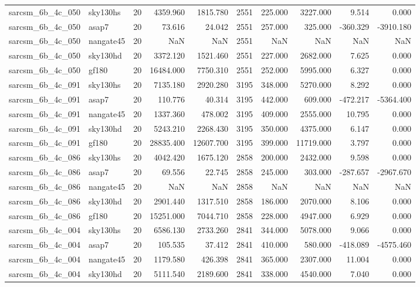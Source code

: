 \begin{longtable}{llrrrrrrrr}
sarcsm\_6b\_4c\_050 & sky130hs & 20 & 4359.960 & 1815.780 & 2551 & 225.000 & 3227.000 & 9.514 & 0.000 \\
sarcsm\_6b\_4c\_050 & asap7 & 20 & 73.616 & 24.042 & 2551 & 257.000 & 325.000 & -360.329 & -3910.180 \\
sarcsm\_6b\_4c\_050 & nangate45 & 20 & NaN & NaN & 2551 & NaN & NaN & NaN & NaN \\
sarcsm\_6b\_4c\_050 & sky130hd & 20 & 3372.120 & 1521.460 & 2551 & 227.000 & 2682.000 & 7.625 & 0.000 \\
sarcsm\_6b\_4c\_050 & gf180 & 20 & 16484.000 & 7750.310 & 2551 & 252.000 & 5995.000 & 6.327 & 0.000 \\
sarcsm\_6b\_4c\_091 & sky130hs & 20 & 7135.180 & 2920.280 & 3195 & 348.000 & 5270.000 & 8.292 & 0.000 \\
sarcsm\_6b\_4c\_091 & asap7 & 20 & 110.776 & 40.314 & 3195 & 442.000 & 609.000 & -472.217 & -5364.400 \\
sarcsm\_6b\_4c\_091 & nangate45 & 20 & 1337.360 & 478.002 & 3195 & 409.000 & 2555.000 & 10.795 & 0.000 \\
sarcsm\_6b\_4c\_091 & sky130hd & 20 & 5243.210 & 2268.430 & 3195 & 350.000 & 4375.000 & 6.147 & 0.000 \\
sarcsm\_6b\_4c\_091 & gf180 & 20 & 28835.400 & 12607.700 & 3195 & 399.000 & 11719.000 & 3.797 & 0.000 \\
sarcsm\_6b\_4c\_086 & sky130hs & 20 & 4042.420 & 1675.120 & 2858 & 200.000 & 2432.000 & 9.598 & 0.000 \\
sarcsm\_6b\_4c\_086 & asap7 & 20 & 69.556 & 22.745 & 2858 & 245.000 & 303.000 & -287.657 & -2967.670 \\
sarcsm\_6b\_4c\_086 & nangate45 & 20 & NaN & NaN & 2858 & NaN & NaN & NaN & NaN \\
sarcsm\_6b\_4c\_086 & sky130hd & 20 & 2901.440 & 1317.510 & 2858 & 186.000 & 2070.000 & 8.106 & 0.000 \\
sarcsm\_6b\_4c\_086 & gf180 & 20 & 15251.000 & 7044.710 & 2858 & 228.000 & 4947.000 & 6.929 & 0.000 \\
sarcsm\_6b\_4c\_004 & sky130hs & 20 & 6586.130 & 2733.260 & 2841 & 344.000 & 5078.000 & 9.066 & 0.000 \\
sarcsm\_6b\_4c\_004 & asap7 & 20 & 105.535 & 37.412 & 2841 & 410.000 & 580.000 & -418.089 & -4575.460 \\
sarcsm\_6b\_4c\_004 & nangate45 & 20 & 1179.580 & 426.398 & 2841 & 365.000 & 2307.000 & 11.004 & 0.000 \\
sarcsm\_6b\_4c\_004 & sky130hd & 20 & 5111.540 & 2189.600 & 2841 & 338.000 & 4540.000 & 7.040 & 0.000 \\

\end{longtable}
